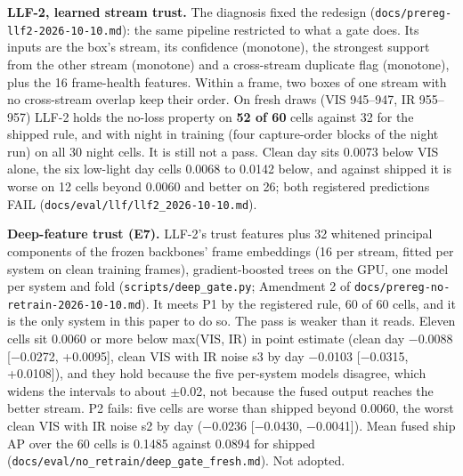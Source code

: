 \documentclass[journal,onecolumn]{IEEEtran}
\begin{document}
\textbf{LLF-2, learned stream trust.} The diagnosis fixed the redesign (\texttt{docs/\allowbreak{}prereg-\allowbreak{}llf2-\allowbreak{}2026-\allowbreak{}10-\allowbreak{}10.md}): the same pipeline restricted to what a gate does. Its inputs are the box's stream, its confidence (monotone), the strongest support from the other stream (monotone) and a cross-stream duplicate flag (monotone), plus the 16 frame-health features. Within a frame, two boxes of one stream with no cross-stream overlap keep their order. On fresh draws (VIS 945--947, IR 955--957) LLF-2 holds the no-loss property on \textbf{52 of 60} cells against 32 for the shipped rule, and with night in training (four capture-order blocks of the night run) on all 30 night cells. It is still not a pass. Clean day sits 0.0073 below VIS alone, the six low-light day cells 0.0068 to 0.0142 below, and against shipped it is worse on 12 cells beyond 0.0060 and better on 26; both registered predictions FAIL (\texttt{docs/\allowbreak{}eval/\allowbreak{}llf/\allowbreak{}llf2\_\allowbreak{}2026-\allowbreak{}10-\allowbreak{}10.md}).

\textbf{Deep-feature trust (E7).} LLF-2's trust features plus 32 whitened principal components of the frozen backbones' frame embeddings (16 per stream, fitted per system on clean training frames), gradient-boosted trees on the GPU, one model per system and fold (\texttt{scripts/\allowbreak{}deep\_\allowbreak{}gate.py}; Amendment 2 of \texttt{docs/\allowbreak{}prereg-\allowbreak{}no-\allowbreak{}retrain-\allowbreak{}2026-\allowbreak{}10-\allowbreak{}10.md}). It meets P1 by the registered rule, 60 of 60 cells, and it is the only system in this paper to do so. The pass is weaker than it reads. Eleven cells sit 0.0060 or more below max(VIS, IR) in point estimate (clean day $-$0.0088 [$-$0.0272, +0.0095], clean VIS with IR noise s3 by day $-$0.0103 [$-$0.0315, +0.0108]), and they hold because the five per-system models disagree, which widens the intervals to about $\pm$0.02, not because the fused output reaches the better stream. P2 fails: five cells are worse than shipped beyond 0.0060, the worst clean VIS with IR noise s2 by day ($-$0.0236 [$-$0.0430, $-$0.0041]). Mean fused ship AP over the 60 cells is 0.1485 against 0.0894 for shipped (\texttt{docs/\allowbreak{}eval/\allowbreak{}no\_\allowbreak{}retrain/\allowbreak{}deep\_\allowbreak{}gate\_\allowbreak{}fresh.md}). Not adopted.
\end{document}
